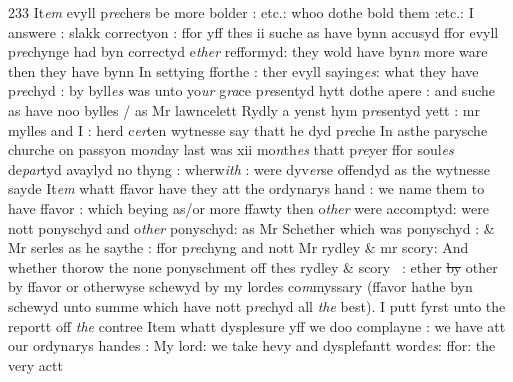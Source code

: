 \documentclass[12pt, a4paper]{book}
\begin{document}
{\color{Mahogany}233} It\textit{em} evyll p\textit{re}chers be more bolder : etc.: whoo dothe bold them :etc.: I answere : slakk correctyon : ffor yff thes ii suche as have bynn accusyd ffor evyll p\textit{re}chynge had byn correctyd e\textit{ther} refformyd: they wold have byn\textit{n} more ware then  they have bynn In settying fforthe : ther evyll saying\textit{es}: what they have p\textit{re}chyd : by byll\textit{es} was unto yo\textit{ur} g\textit{ra}ce p\textit{re}sentyd hytt dothe apere : and suche as have noo bylles / as Mr lawncelett Rydly a yenst hym p\textit{re}sentyd yett : mr mylles and I : herd c\textit{er}ten wytnesse say thatt he dyd p\textit{re}che In asthe parysche churche on passyon mo\textit{n}day last was xii mo\textit{n}th\textit{es} thatt p\textit{re}yer ffor soul\textit{es} de\textit{par}tyd avaylyd no thyng : wherw\textit{ith} : were dyv\textit{er}se offendyd as the wytnesse sayde It\textit{em} whatt ffavor have they att the ordynarys hand :  we name them to have ffavor : which beying as/or more
			 ffawty then
			 o\textit{ther} were accomptyd: were nott ponyschyd and o\textit{ther} ponyschyd: as
			 Mr Schether which 
			was ponyschyd : \& Mr serles as he saythe : ffor p\textit{re}chyng and nott
			 Mr rydley \& mr scory: And whether thorow  the none ponyschment off thes rydley \& scory 
			 : ether \sout{by  }other by
			 ffavor or
			 otherwyse schewyd by my lordes co\textit{m}myssary (ffavor hathe byn schewyd unto summe 
			which have nott p\textit{re}chyd all \textit{the }best). I putt fyrst unto the reportt off \textit{the }contree Item whatt dysplesure yff we doo complayne : we have att our ordynarys handes : My lord: we take hevy and dysplefantt word\textit{es}: ffor: the very actt
			
\end{document}

